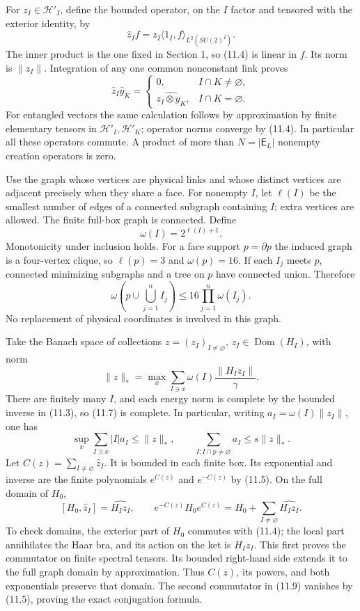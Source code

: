 \documentclass[
]{article}
\begin{document}
For \(z_I\in\mathcal H'_I\), define the bounded operator, on the \(I\)
factor and tensored with the exterior identity, by \[
\widehat z_I f=z_I\langle1_I,f\rangle_{L^2(SU(2)^I)}.
                                                               \tag{11.4}
\] The inner product is the one fixed in Section 1, so (11.4) is linear
in \(f\). Its norm is \(\|z_I\|\). Integration of any one common
nonconstant link proves \[
\widehat z_I\widehat y_K=
\begin{cases}
0,&I\cap K\ne\varnothing,\\
\widehat{z_I\otimes y_K},&I\cap K=\varnothing.
\end{cases}                                                   \tag{11.5}
\] For entangled vectors the same calculation follows by approximation
by finite elementary tensors in \(\mathcal H'_I,\mathcal H'_K\);
operator norms converge by (11.4). In particular all these operators
commute. A product of more than \(N=|\mathsf E_L|\) nonempty creation
operators is zero.

Use the graph whose vertices are physical links and whose distinct
vertices are adjacent precisely when they share a face. For nonempty
\(I\), let \(\ell(I)\) be the smallest number of edges of a connected
subgraph containing \(I\); extra vertices are allowed. The finite
full-box graph is connected. Define \[
\omega(I)=2^{\ell(I)+1}.
\] Monotonicity under inclusion holds. For a face support
\(p=\partial p\) the induced graph is a four-vertex clique, so
\(\ell(p)=3\) and \(\omega(p)=16\). If each \(I_j\) meets \(p\),
connected minimizing subgraphs and a tree on \(p\) have connected union.
Therefore \[
\omega\left(p\cup\bigcup_{j=1}^n I_j\right)
 \le16\prod_{j=1}^n\omega(I_j).                               \tag{11.6}
\] No replacement of physical coordinates is involved in this graph.

Take the Banach space of collections \(z=(z_I)_{I\ne\varnothing}\),
\(z_I\in\operatorname{Dom}(H_I)\), with norm \[
\|z\|_*=\max_x\sum_{I\ni x}
     \omega(I)\frac{\|H_Iz_I\|}{\gamma}.
                                                               \tag{11.7}
\] There are finitely many \(I\), and each energy norm is complete by
the bounded inverse in (11.3), so (11.7) is complete. In particular,
writing \(a_I=\omega(I)\|z_I\|\), one has \[
\sup_x\sum_{I\ni x}|I|a_I\le\|z\|_*,
\qquad
\sum_{I:I\cap p\ne\varnothing}a_I\le s\|z\|_* .                \tag{11.8}
\] Let \(C(z)=\sum_{I\ne\varnothing}\widehat z_I\). It is bounded in
each finite box. Its exponential and inverse are the finite polynomials
\(e^{C(z)}\) and \(e^{-C(z)}\) by (11.5). On the full domain of \(H_0\),
\[
[H_0,\widehat z_I]=\widehat{H_Iz_I},\qquad
e^{-C(z)}H_0e^{C(z)}
 =H_0+\sum_{I\ne\varnothing}\widehat{H_Iz_I}.                  \tag{11.9}
\] To check domains, the exterior part of \(H_0\) commutes with (11.4);
the local part annihilates the Haar bra, and its action on the ket is
\(H_Iz_I\). This first proves the commutator on finite spectral tensors.
Its bounded right-hand side extends it to the full graph domain by
approximation. Thus \(C(z)\), its powers, and both exponentials preserve
that domain. The second commutator in (11.9) vanishes by (11.5), proving
the exact conjugation formula.
\end{document}
